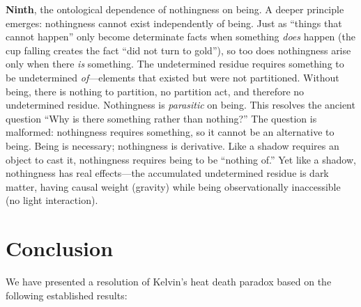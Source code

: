 \documentclass[12pt,a4paper]{article}
\theoremstyle{definition}
\theoremstyle{remark}
\begin{document}
\textbf{Ninth}, the ontological dependence of nothingness on being. A deeper principle emerges: nothingness cannot exist independently of being. Just as ``things that cannot happen'' only become determinate facts when something \emph{does} happen (the cup falling creates the fact ``did not turn to gold''), so too does nothingness arise only when there \emph{is} something. The undetermined residue requires something to be undetermined \emph{of}---elements that existed but were not partitioned. Without being, there is nothing to partition, no partition act, and therefore no undetermined residue. Nothingness is \emph{parasitic} on being. This resolves the ancient question ``Why is there something rather than nothing?'' The question is malformed: nothingness requires something, so it cannot be an alternative to being. Being is necessary; nothingness is derivative. Like a shadow requires an object to cast it, nothingness requires being to be ``nothing of.'' Yet like a shadow, nothingness has real effects---the accumulated undetermined residue is dark matter, having causal weight (gravity) while being observationally inaccessible (no light interaction).

\section{Conclusion}

We have presented a resolution of Kelvin's heat death paradox based on the following established results:
\end{document}
